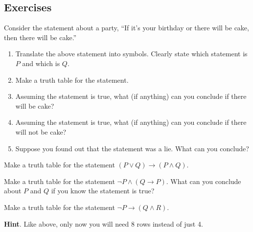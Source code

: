 \documentclass[10pt,]{book}
\theoremstyle{plain}
\theoremstyle{definition}
\theoremstyle{definition}
\theoremstyle{definition}
\theoremstyle{definition}
\numberwithin{equation}{chapter}
\def\imp{\rightarrow}
\begin{document}
\subsection*{Exercises}\label{exercises_sec-logic}
\begin{divisionexercise}{1}\hypertarget{exercise-220}{}
\hypertarget{p-1963}{}%
Consider the statement about a party, ``If it's your birthday or there will be cake, then there will be cake.''%
\par
\hypertarget{p-1964}{}%
\leavevmode%
\begin{enumerate}[label=(\alph*)]
\item\hypertarget{li-641}{}\hypertarget{p-1965}{}%
Translate the above statement into symbols. Clearly state which statement is \(P\) and which is \(Q\).%
\item\hypertarget{li-642}{}\hypertarget{p-1966}{}%
Make a truth table for the statement.%
\item\hypertarget{li-643}{}\hypertarget{p-1967}{}%
Assuming the statement is true, what (if anything) can you conclude if there will be cake?%
\item\hypertarget{li-644}{}\hypertarget{p-1968}{}%
Assuming the statement is true, what (if anything) can you conclude if there will not be cake?%
\item\hypertarget{li-645}{}\hypertarget{p-1969}{}%
Suppose you found out that the statement was a lie. What can you conclude?%
\end{enumerate}
%
\end{divisionexercise}%
\begin{divisionexercise}{2}\hypertarget{exercise-221}{}
\hypertarget{p-1975}{}%
Make a truth table for the statement \((P \vee Q) \imp (P \wedge Q)\).%
\end{divisionexercise}%
\begin{divisionexercise}{3}\hypertarget{exercise-222}{}
\hypertarget{p-1976}{}%
Make a truth table for the statement \(\neg P \wedge (Q \imp P)\). What can you conclude about \(P\) and \(Q\) if you know the statement is true?%
\end{divisionexercise}%
\begin{divisionexercise}{4}\hypertarget{exercise-223}{}
\hypertarget{p-1978}{}%
Make a truth table for the statement \(\neg P \imp (Q \wedge R)\).%
\par\smallskip%
\noindent\textbf{Hint}.\hypertarget{hint-94}{}\quad%
\hypertarget{p-1979}{}%
Like above, only now you will need 8 rows instead of just 4.%
\end{divisionexercise}%
\end{document}
